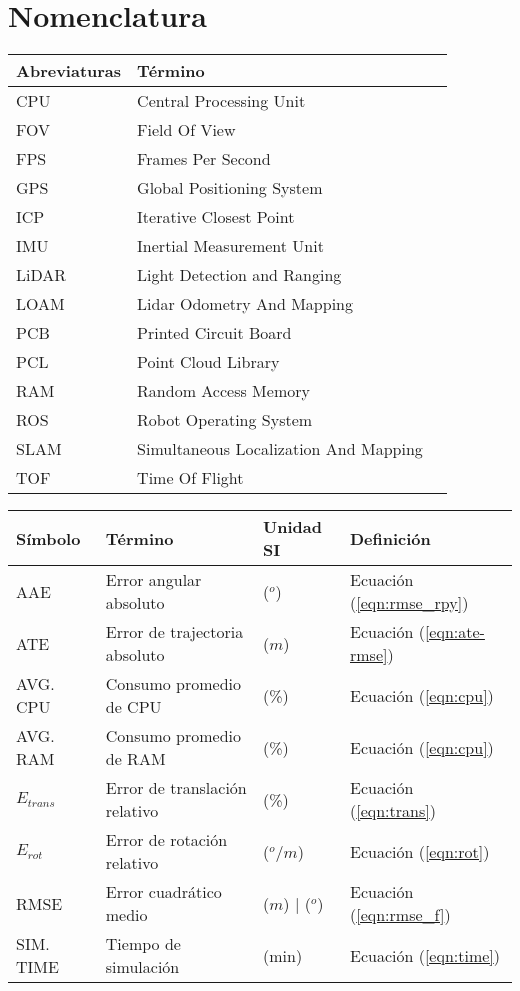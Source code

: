 \documentclass[a4paper,oneside,12pt]{book}
\begin{document}
\renewcommand*\contentsname{Contenido}
\renewcommand{\listfigurename}{Lista de Figuras}
\renewcommand{\listtablename}{Lista de Tablas}
\tableofcontents
\listoffigures
\listoftables
\newpage
\section*{\Huge{Nomenclatura}}
\vspace{0.6cm}
\begin{tabular}{lp{9cm}l}
\large{\textbf{Abreviaturas}} & \large{\textbf{Término}} \\ \hline \addlinespace[0.1cm]
CPU & Central Processing Unit \\ 
FOV & Field Of View\\
FPS & Frames Per Second \\
GPS & Global Positioning System \\
ICP & Iterative Closest Point \\
IMU & Inertial Measurement Unit \\
LiDAR & Light Detection and Ranging\\
LOAM & Lidar Odometry And Mapping\\
PCB & Printed Circuit Board \\
PCL & Point Cloud Library \\
RAM & Random Access Memory \\
ROS & Robot Operating System \\
SLAM & Simultaneous Localization And Mapping\\
TOF  & Time Of Flight\\
\end{tabular}
\vspace{0.9cm}

\begin{tabular}{p{3cm} p{5.7cm} p{3cm} p{3cm}}
\large{\textbf{Símbolo}} & \large{\textbf{Término}} & \large{\textbf{Unidad SI}} & \large{\textbf{Definición}}\\ \hline \addlinespace[0.1cm]
AAE & Error angular absoluto & ($^o$) & Ecuación (\ref{eqn:rmse_rpy}) \\
ATE & Error de trajectoria absoluto & ($m$) & Ecuación (\ref{eqn:ate-rmse})  \\
\small{AVG. CPU} & Consumo promedio de CPU & (\%) & Ecuación (\ref{eqn:cpu})\\
\small{AVG. RAM} & Consumo promedio de RAM & (\%) & Ecuación (\ref{eqn:cpu})\\
$E_{trans} $ & Error de translación relativo & (\%) & Ecuación (\ref{eqn:trans}) \\
$E_{rot} $ & Error de rotación relativo & ($^o/m$) & Ecuación (\ref{eqn:rot})\\
RMSE & Error cuadrático medio & ($m$) | ($^o$) & Ecuación (\ref{eqn:rmse_f}) \\
\small{SIM. TIME} & Tiempo de simulación & (min) & Ecuación (\ref{eqn:time})\\

\end{tabular}
\vspace{2cm}
\end{document}
